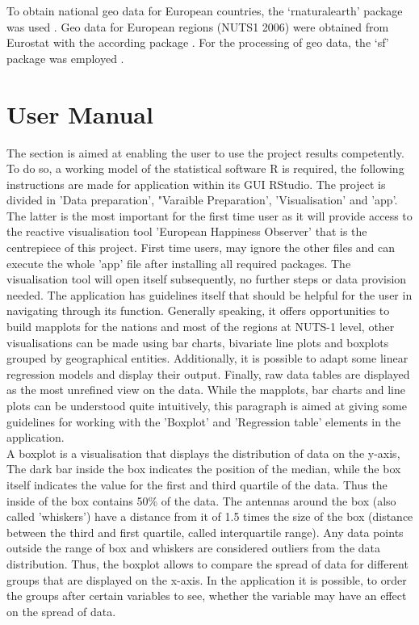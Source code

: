 \documentclass[preprint,12pt,authoryear]{elsarticle}
\begin{document}
To obtain national geo data for European countries, the `rnaturalearth' package was used \citep{south_rnaturalearth:_2017}.
Geo data for European regions (NUTS1 2006) were obtained from Eurostat with the according package \citep{lahti_eurostat:_2019}. For the 
processing of geo data, the `sf' package was employed \citep{pebesma_sf:_2018}.
	
\section{User Manual}
The section is aimed at enabling the user to use the project results competently. To do so, a working model of the statistical software R is required, the following instructions are made for application within its GUI RStudio. The project is divided in 'Data preparation', "Varaible Preparation', 'Visualisation' and 'app'. The latter is the most important for the first time user as it will provide access to the reactive visualisation tool 'European Happiness Observer' that is the centrepiece of this project. First time users, may ignore the other files and can execute the whole 'app' file after installing all required packages. The visualisation tool will open itself subsequently, no further steps or data provision needed. The application has guidelines itself that should be helpful for the user in navigating through its function. Generally speaking, it offers opportunities to build mapplots for the nations and most of the regions at NUTS-1 level, other visualisations can be made using bar charts, bivariate line plots and boxplots grouped by geographical entities. Additionally, it is possible to adapt some linear regression models and display their output. Finally, raw data tables are displayed as the most unrefined view on the data. While the mapplots, bar charts and line plots can be understood quite intuitively, this paragraph is aimed at giving some guidelines for working with the 'Boxplot' and 'Regression table' elements in the application.\\

A boxplot is a visualisation that displays the distribution of data on the y-axis,  The dark bar inside the box indicates the position of the median, while the box itself indicates the value for the first and third quartile of the data. Thus the inside of the box contains 50\% of the data. The antennas around the box (also called 'whiskers') have a distance from it of 1.5 times the size of the box (distance between the third and first quartile, called interquartile range). Any data points outside the range of box and whiskers are considered outliers from the data distribution. Thus, the boxplot allows to compare the spread of data for different groups that are displayed on the x-axis. In the application it is possible, to order the groups after certain variables to see, whether the variable may have an effect on the spread of data.\\
\end{document}
